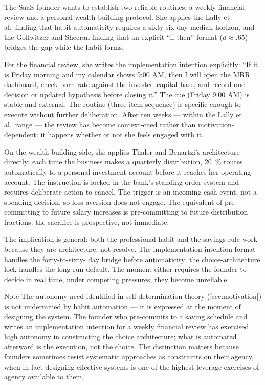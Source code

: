 \begin{example}
The SaaS founder wants to establish two reliable routines: a weekly financial review and a
personal wealth-building protocol. She applies the Lally et al.\ finding that habit
automaticity requires a sixty-six-day median horizon, and the Gollwitzer and Sheeran finding
that an explicit ``if-then'' format ($d \approx .65$) bridges the gap while the habit forms.

For the financial review, she writes the implementation intention explicitly: ``If it is Friday
morning and my calendar shows 9:00 AM, then I will open the MRR dashboard, check burn rate
against the  invested-capital base, and record one decision or updated hypothesis
before closing it.'' The cue (Friday 9:00 AM) is stable and external. The routine (three-item
sequence) is specific enough to execute without further deliberation. After ten weeks --- within
the Lally et al.\ range --- the review has become context-cued rather than motivation-dependent:
it happens whether or not she feels engaged with it.

On the wealth-building side, she applies Thaler and Benartzi's architecture directly: each
time the business makes a quarterly distribution, \qty{20}{\percent} routes automatically to a
personal investment account before it reaches her operating account. The instruction is locked
in the bank's standing-order system and requires deliberate action to cancel. The trigger is an
incoming-cash event, not a spending decision, so loss aversion does not engage. The equivalent
of pre-committing to future salary increases is pre-committing to future distribution fractions:
the sacrifice is prospective, not immediate.

The implication is general: both the professional habit and the savings rule work because they
are architecture, not resolve. The implementation-intention format handles the forty-to-sixty-
day bridge before automaticity; the choice-architecture lock handles the long-run default. The
moment either requires the founder to decide in real time, under competing pressures, they
become unreliable.
\end{example}

\begin{admonition}{Note}
The autonomy need identified in self-determination theory (\cref{sec:motivation}) is not
undermined by habit automation --- it is expressed at the moment of designing the system. The
founder who pre-commits to a saving schedule and writes an implementation intention for a weekly
financial review has exercised high autonomy in constructing the choice architecture; what is
automated afterward is the execution, not the choice. The distinction matters because founders
sometimes resist systematic approaches as constraints on their agency, when in fact designing
effective systems is one of the highest-leverage exercises of agency available to them.
\end{admonition}

